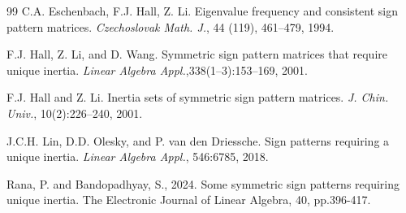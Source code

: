 \documentclass[10pt,a4paper]{amsart}
\numberwithin{equation}{section}
\begin{document}
\begin{thebibliography}{99}
 	C.A. Eschenbach, F.J. Hall, Z. Li. Eigenvalue frequency and consistent sign pattern matrices. \textit{Czechoslovak Math. J.}, 44 (119), 461–479, 1994.
	
	
	
	
	
	
	
	
	
   F.J.  Hall,  Z.  Li,  and  D.  Wang.   Symmetric sign pattern matrices that require unique inertia. \textit{Linear Algebra Appl.},338(1–3):153–169, 2001.
	
  F.J. Hall and Z. Li.  Inertia sets of symmetric sign pattern matrices. \textit{J. Chin. Univ.}, 10(2):226–240, 2001.
	
	
  J.C.H. Lin, D.D. Olesky, and P. van den Driessche. Sign patterns requiring a unique inertia. \textit{Linear Algebra Appl.}, 546:67{85, 2018}.
	
  Rana, P. and Bandopadhyay, S., 2024. Some symmetric sign patterns requiring unique inertia. The Electronic Journal of Linear Algebra, 40, pp.396-417.
\end{thebibliography}
\end{document}

